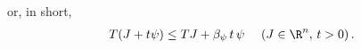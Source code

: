 or, in short,
\begin{align}
\label{eq:psilin}
T(J+ t \psi ) \le TJ + \beta_{\psi}\,t\,  \psi\,\, \quad (J\in \R^n,\, t>0)\,.
\end{align}
\begin{comment}
We will now recall two results due to de Farias and Van Roy 
	that bound the error due to the introduction of the extra constraint in the ALP.
For this, we will need the definition of weighted $L_1$ and $L_\infty$ norms.
For any $c,\rho:S \to \R$ positive valued functions
the weighted $L_1$-norms $\norm{\cdot}_{1,c}$ 
and 
the weighted $L_\infty$-norms  $\norm{\cdot}_{\infty,\rho}$ are defined as
\begin{align*}
||J||_{1,c}=\sum_{s \in S} c(s)|J(s)|\,, \qquad
||J||_{\infty,\rho}=\max_{s \in S} \frac{|J(s)|}{\rho(s)}\,, \qquad J:S\to \R\,.
\end{align*}

We let $\R_+$ denote the set of nonnegative reals. \todoc{Move up?}
For any function $\chi\colon S\ra \R_+$, define the discounted maximal inflation of $\chi$ due to $P = (p_a)_{a\in A}$ as
\begin{align*}
\beta_{\chi}=\max_{s \in S} \frac{\underset{a \in A}{\max}\big(\alpha\sum_{s'}p_a(s,s')\chi(s')\big)}{\chi(s)}\,.
\end{align*}
\begin{definition}
A function $\chi:S\to\R_+$ is said to be a \emph{Lyapunov} function for $P = (p_a)_{a\in A}$ 
	if $\beta_{\chi}<1$.
\end{definition}
The error bound will be given in terms of a Lyapunov function $\psi$ for $P$ that is in the column span of $\Phi$:
\begin{assumption}\label{lyap}
$\psi\colon S \ra \R_+$ is a Lyapunov function for $P$
and is present in the column span of the feature matrix $\Phi$: For some $r_0\in \R^k$, $\Phi r_0 = \psi$.
\end{assumption}
It is straightforward to check that the vector $\one$ when viewed as an $S \to \R_+$ function 
is a Lyapunov function. 
Further, by \cref{one}, $\one$ is trivially present in the column span of $\Phi$, 
hence, \cref{lyap} is not limiting.
In what follows we will always assume that Assumptions \ref{probdist}--\ref{lyap} hold. 
When \cref{lyap} holds, it follows that for any $J\in \R^n$, $t>0$, $s\in S$,
\begin{align*}
(T(J+ t \psi))(s) &= 
\max_{a} g_a(s) + \alpha \sum_{s'} p_a(s,s') J(s') + t \alpha  \sum_{s'} p_a(s,s') \psi(s') \\
& \le 
\max_{a} g_a(s) + \alpha \sum_{s'} p_a(s,s') J(s') + t \beta_{\psi} \psi(s) \\
& = (T J)(s) + \beta_{\psi}\,t\,  \psi(s),
\end{align*}
or, in short,
\begin{align}
\label{eq:psilin}
T(J+ t \psi ) \le TJ + \beta_{\psi}\,t\,  \psi\,\, \quad (J\in \R^n,\, t>0)\,.
\end{align}


\end{comment}
